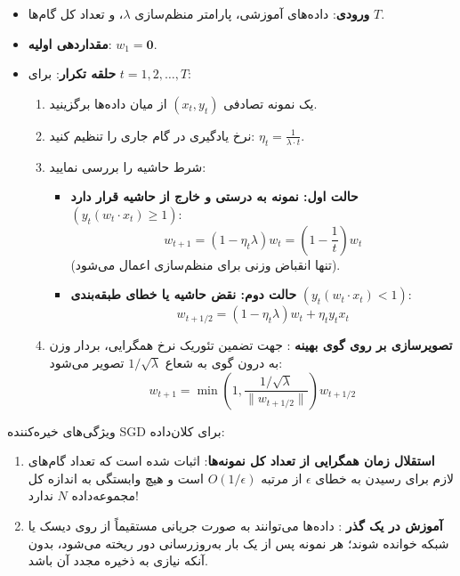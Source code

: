 \begin{algorithmbox}
\begin{itemize}
    \item \textbf{ورودی}: داده‌های آموزشی، پارامتر منظم‌سازی $\lambda$، و تعداد کل گام‌ها $T$.
    \item \textbf{مقداردهی اولیه}: $w_1 = \mathbf{0}$.
    \item \textbf{حلقه تکرار}: برای $t = 1, 2, \dots, T$:
    \begin{enumerate}
        \item یک نمونه تصادفی $(x_t, y_t)$ از میان داده‌ها برگزینید.
        \item نرخ یادگیری در گام جاری را تنظیم کنید: $\eta_t = \frac{1}{\lambda \cdot t}$.
        \item شرط حاشیه را بررسی نمایید:
        \begin{itemize}
            \item \textbf{حالت اول: نمونه به درستی و خارج از حاشیه قرار دارد} $(y_t (w_t \cdot x_t) \ge 1)$:
            \begin{equation}
            w_{t+1} = (1 - \eta_t \lambda) w_t = \left( 1 - \frac{1}{t} \right) w_t
            \end{equation}
            (تنها انقباض وزنی برای منظم‌سازی اعمال می‌شود).
            
            \item \textbf{حالت دوم: نقض حاشیه یا خطای طبقه‌بندی} $(y_t (w_t \cdot x_t) < 1)$:
            \begin{equation}
            w_{t+1/2} = (1 - \eta_t \lambda) w_t + \eta_t y_t x_t
            \end{equation}
        \end{itemize}
        \item \textbf{تصویرسازی بر روی گوی بهینه }:
        جهت تضمین تئوریک نرخ همگرایی، بردار وزن به درون گوی به شعاع $1/\sqrt{\lambda}$ تصویر می‌شود:
        \begin{equation}
        w_{t+1} = \min\left(1, \frac{1/\sqrt{\lambda}}{\|w_{t+1/2}\|}\right) w_{t+1/2}
        \end{equation}
    \end{enumerate}
\end{itemize}
\end{algorithmbox}

\begin{examnote}
ویژگی‌های خیره‌کننده SGD برای کلان‌داده:
\begin{enumerate}
    \item \textbf{استقلال زمان همگرایی از تعداد کل نمونه‌ها}: اثبات شده است که تعداد گام‌های لازم برای رسیدن به خطای $\epsilon$ از مرتبه $O(1/\epsilon)$ است و هیچ وابستگی به اندازه کل مجموعه‌داده $N$ ندارد!
    \item \textbf{آموزش در یک گذر }: داده‌ها می‌توانند به صورت جریانی مستقیماً از روی دیسک یا شبکه خوانده شوند؛ هر نمونه پس از یک بار به‌روزرسانی دور ریخته می‌شود، بدون آنکه نیازی به ذخیره مجدد آن باشد.
\end{enumerate}
\end{examnote}

